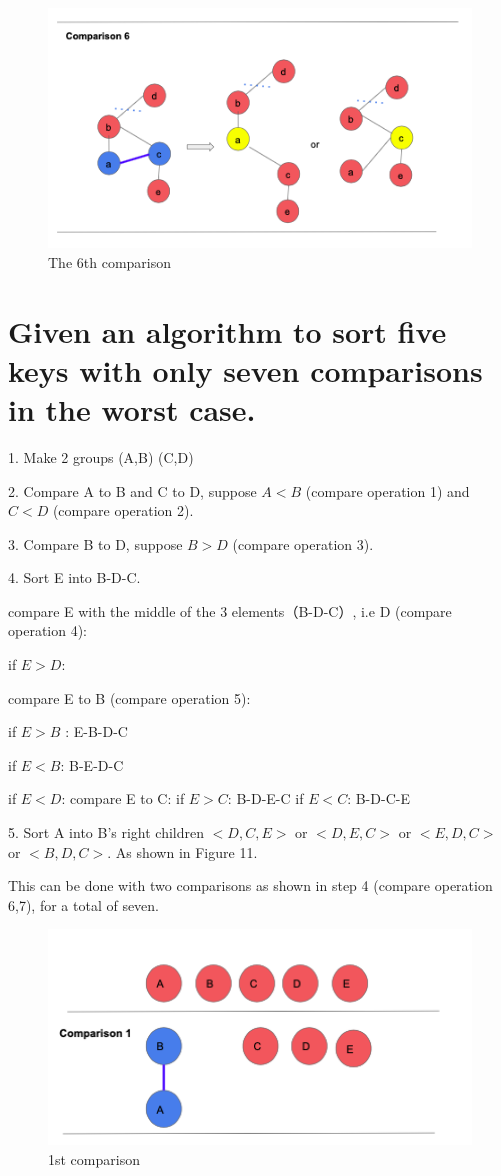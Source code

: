 \documentclass[12pt]{article}
\theoremstyle{plain}
\begin{document}
\begin{figure}[h]
\includegraphics[width=12cm]{6.png}
\centering
\caption{The 6th comparison}
\label{BF}
\end{figure}



\clearpage

\section{Given an algorithm to sort five keys with only seven comparisons in the worst case.}



1. Make 2 groups (A,B) (C,D)

2. Compare A to B and C to D, suppose $A<B$ (compare operation 1) and $C<D$ (compare operation 2). 

3. Compare B to D, suppose $B>D$ (compare operation 3).

4. Sort E into B-D-C.
    
    compare E with the middle of the 3 elements（B-D-C）, i.e D (compare operation 4):
    
    
    if $E> D$:
        
        compare E to B (compare operation 5):
        
        if $E > B $ : E-B-D-C
        
        if $E < B$: B-E-D-C
    
    if $E <D$:
        compare E to C:
        if $E > C$: B-D-E-C
        if $E < C$: B-D-C-E

5. Sort A into B's right children $<D,C,E>$ or $<D,E,C>$ or $<E,D,C>$ or $<B,D,C>$. As shown in Figure 11.
    
    This can be done with two comparisons as shown in step 4 (compare operation 6,7), for a total of seven.
\begin{figure}[h]
\includegraphics[width=12cm]{21.png}
\centering
\caption{1st comparison}
\label{BF}
\end{figure}
\end{document}
